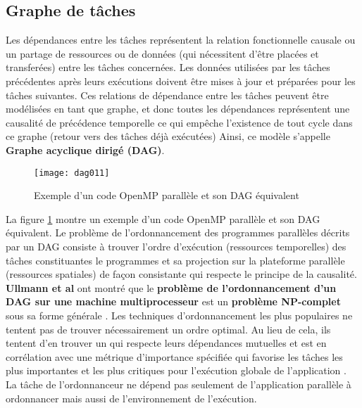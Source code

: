 \subsection{Graphe de tâches}\label{ullmanNP}
%
Les dépendances entre les tâches représentent la relation fonctionnelle causale ou un partage de ressources ou de données (qui nécessitent d'être placées et transferées) entre les tâches concernées. Les données  utilisées par les tâches précédentes après leurs exécutions doivent être mises à jour et préparées pour les tâches suivantes. 
Ces relations de dépendance entre les tâches peuvent être modélisées en tant que graphe, et donc toutes les dépendances représentent une causalité de précédence temporelle ce qui empêche l'existence de tout cycle dans ce graphe (retour vers des tâches déjà exécutées) 
Ainsi, ce modèle s'appelle \textbf{Graphe acyclique dirigé (DAG)}.
%
%
%
\begin{figure}
\texttt{[image: dag011]}
\centering
\caption{Exemple d'un code OpenMP parallèle et son DAG équivalent}
\label{fig:FG_3_1_0}
\end{figure} 
La figure \ref{fig:FG_3_1_0} montre un exemple d'un code OpenMP parallèle et son DAG équivalent.
%
Le problème de l'ordonnancement des programmes parallèles décrits par un DAG consiste à trouver l'ordre d'exécution (ressources temporelles) des tâches constituantes le programmes et sa projection sur la plateforme parallèle (ressources spatiales) de façon consistante qui respecte le principe de la causalité.
\textbf{Ullmann et al} ont montré que le \textbf{problème de l'ordonnancement d'un DAG sur une machine multiprocesseur} est un \textbf{problème NP-complet} sous sa forme générale \cite{Ull75}.
%
Les techniques d'ordonnancement les plus populaires ne tentent pas de trouver nécessairement un ordre optimal. 
Au lieu de cela, ils tentent d'en trouver un qui respecte leurs dépendances mutuelles et est en corrélation avec une métrique d'importance spécifiée qui favorise les tâches les plus importantes et les plus critiques pour l'exécution globale de l'application \cite{KA99}. 
La tâche de l'ordonnanceur ne dépend pas seulement de l'application parallèle à ordonnancer mais aussi de l'environnement de l'exécution.
